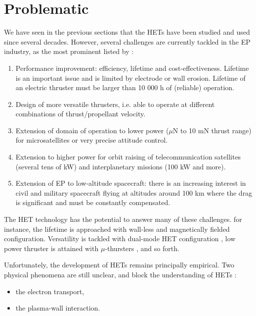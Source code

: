 
\section*{Problematic}
\label{sec-problematic}

We have seen in the previous sections that the \ac{HET}s have been studied and used since several decades.
However, several challenges are currently tackled in the \ac{EP} industry, as the most prominent listed by \citet{samukawa2012} \string:
\begin{enumerate}
  \item Performance improvement\string: efficiency, lifetime and cost-effectiveness.
   Lifetime is an important issue and is limited by electrode or wall erosion.
   Lifetime of an electric thruster must be larger than 10 000 h of (reliable) operation.
   \item  Design of more versatile thrusters, i.e. able to operate at different combinations of thrust/propellant velocity.
   \item  Extension of domain of operation to lower power ($\mu$N to 10 mN thrust range) for microsatellites or very precise attitude control.
   \item  Extension to higher power for orbit raising of telecommunication satellites (several tens of kW) and    interplanetary missions (100 kW and more).
   \item Extension of EP to low-altitude spacecraft\string: there is an increasing interest in civil and military spacecraft flying  at altitudes around 100 km where the drag is significant and must be constantly compensated.
\end{enumerate}

The \ac{HET} technology has the potential to answer many of these challenges.
for instance, the lifetime is approached with wall-less and magnetically fielded configuration.
Versatility is tackled with dual-mode \ac{HET} configuration \citep{boniface2017}, low power thruster is attained with $\mu$-thursters \citep{lascombes2018}, and so forth.

Unfortunately, the development of \ac{HET}s remains principally empirical. 
Two physical phenomena are still unclear, and block the understanding of \ac{HET}s \citep{samukawa2012,adamovich2017}\string:
\begin{itemize}
  \item the electron transport,
  \item the plasma-wall interaction.
\end{itemize}

